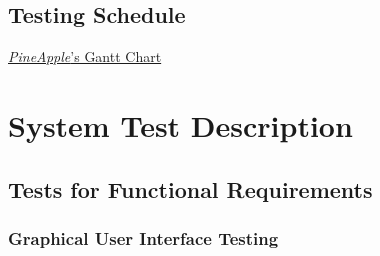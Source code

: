 \documentclass[12pt, titlepage]{article}
\begin{document}
\subsection{Testing Schedule}
\href{run:../DevelopmentPlan/ProjectSchedule.gan}{\textit{PineApple}'s Gantt Chart}

\newpage
\section{System Test Description}	
\subsection{Tests for Functional Requirements}
\subsubsection{Graphical User Interface Testing}
		
\end{document}
